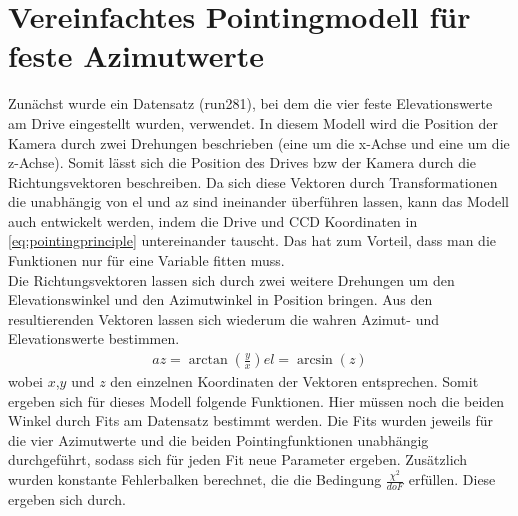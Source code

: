 \section{Vereinfachtes Pointingmodell f\"ur feste Azimutwerte}
Zunächst wurde ein Datensatz (run281), bei dem die vier feste Elevationswerte am Drive eingestellt wurden, verwendet. In diesem Modell wird die Position der Kamera durch zwei Drehungen beschrieben (eine um die x-Achse und eine um die z-Achse). Somit lässt sich die Position des Drives bzw der Kamera durch die Richtungsvektoren beschreiben.
Da sich diese Vektoren durch Transformationen die unabhängig von el und az sind ineinander überführen lassen, kann das Modell auch entwickelt werden, indem die Drive und CCD Koordinaten in \ref{eq:pointingprinciple} untereinander tauscht. Das hat zum Vorteil, dass man die Funktionen nur für eine Variable fitten muss.\\
Die Richtungsvektoren lassen sich durch zwei weitere Drehungen um den Elevationswinkel und den Azimutwinkel in Position bringen. Aus den resultierenden Vektoren lassen sich wiederum die wahren Azimut- und Elevationswerte bestimmen.
\begin{align}
az=\arctan\left(\frac{y}{x}\right)
el=\arcsin(z)
\end{align}
wobei $x$,$y$ und $z$ den einzelnen Koordinaten der Vektoren entsprechen. Somit ergeben sich für dieses Modell folgende Funktionen.
Hier müssen noch die beiden Winkel durch Fits am Datensatz bestimmt werden. Die Fits wurden jeweils für die vier Azimutwerte und die beiden Pointingfunktionen unabhängig durchgeführt, sodass sich für jeden Fit neue Parameter ergeben. Zusätzlich wurden konstante Fehlerbalken berechnet, die die Bedingung $\frac{\chi^2}{doF}$ erfüllen. Diese ergeben sich durch.
